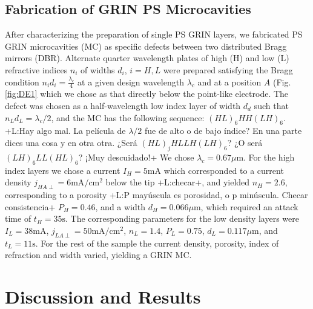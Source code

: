 \documentclass{article}
\newcommand{\notaL}[1]{{\color{blue}+L:#1+}}
\begin{document}
\subsection{Fabrication  of GRIN PS Microcavities}
\label{sec:fabrication-grin-ps}
After characterizing the preparation of single PS GRIN layers, we
fabricated PS GRIN microcavities (MC) as specific defects between two distributed Bragg
mirrors  (DBR). Alternate quarter wavelength plates of high (H) and low (L)
refractive indices $n_i$ of widths $d_i$, $i=H,L$ were prepared satisfying the Bragg condition
$n_id_i=\frac{\lambda_c}{4}$ at a given design
wavelength $\lambda_c$ and at a position $A$ (Fig. \ref{fig:DE1} which
we chose as that directly below the point-like electrode. The defect
was chosen as a half-wavelength low index layer of width $d_d$ such that
$n_Ld_L=\lambda_c/2$, and the MC has the
following sequence: $(HL)_6HH(LH )_6$. \notaL{Hay algo mal. La
  película de $\lambda/2$ fue de alto o de bajo índice? En una parte
  dices una cosa y en otra otra. ¿Será $(HL)_jHLLH(LH)_6$? ¿O será
  $(LH)_6LL(HL)_6$? ¡Muy descuidado!}
We chose $\lambda_c= 0.67 \mu\text{m}$. For the high index layers we
chose a current $I_H=5\text{mA}$ which corresponded to a current density
$j_{HA\perp}= 6\text{mA}/\text{cm}^2$ below the tip \notaL{checar}, and yielded
$n_H =2.6$, corresponding to a porosity \notaL{P mayúscula
  es porosidad, o p minúscula. Checar consistencia} $P_H =0.46$, and a
width $d_H=0.066 \mu\text{m}$, which required an attack time of
$t_H=35 \text{s}$. The corresponding parameters for the low density
layers were $I_L=38\text{mA}$, $j_{LA\perp}=50\text{mA}/\text{cm}^2$, $n_L= 1.4$,  $P_L =0.75$,
$d_L=0.117 \mu \text{m}$, and $t_L=11 \text{s}$. For the rest of the
sample the current density, porosity, index of refraction and width
varied, yielding a GRIN MC.

\section{Discussion and Results}
\label{sec:discussion-results}
\end{document}
